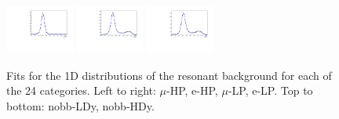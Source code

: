 \begin{figure}[htbp]
  \includegraphics[width=0.2\textwidth]{fig/2Dfit/LNuJJ_res_MJJ_e_HP_nobb_HDy.pdf}
  \includegraphics[width=0.2\textwidth]{fig/2Dfit/LNuJJ_res_MJJ_mu_LP_nobb_HDy.pdf}
  \includegraphics[width=0.2\textwidth]{fig/2Dfit/LNuJJ_res_MJJ_e_LP_nobb_HDy.pdf}\\
  \caption{
    Fits for the 1D \MJ distributions of the resonant background for each of the 24 categories.
    Left to right: $\mu$-HP, e-HP, $\mu$-LP, e-LP.
    Top to bottom: nobb-LDy, nobb-HDy.
  }
  \label{fig:fits_res_MJJ_Run2}
\end{figure}

